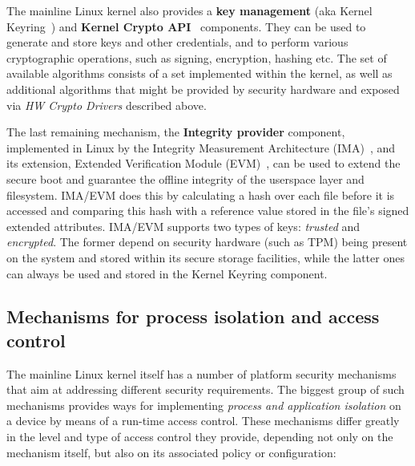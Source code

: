 The mainline Linux kernel also provides a \textbf{key management} (aka Kernel Keyring~\cite{keyrings}) and \textbf{Kernel Crypto API}~\cite{kernelcryptoapi} components. They can be used to generate and store keys and other credentials, and to perform various cryptographic operations, such as signing, encryption, hashing etc. The set of available algorithms consists of a set implemented within the kernel, as well as additional algorithms that might be provided by security hardware and exposed via \textit{HW Crypto Drivers} described above.

The last remaining mechanism, the \textbf{Integrity provider} component, implemented in Linux by the Integrity Measurement Architecture (IMA)~\cite{ima}, and its extension, Extended Verification Module (EVM)~\cite{ima}, can be used to extend the secure boot and guarantee the offline integrity of the userspace layer and filesystem. IMA/EVM does this by calculating a hash over each file before it is accessed and comparing this hash with a reference value stored in the file's signed extended attributes. IMA/EVM supports two types of keys: \textit{trusted} and \textit{encrypted}. The former depend on security hardware (such as TPM) being present on the system and stored within its secure storage facilities, while the latter ones can always be used and stored in the Kernel Keyring component. 

\subsection{Mechanisms for process isolation and access control}

The mainline Linux kernel itself has a number of platform security mechanisms that aim at addressing different security requirements. The biggest group of such mechanisms provides ways for implementing \textit{process and application isolation} on a device by means of a run-time access control. These mechanisms differ greatly in the level and type of access control they provide, depending not only on the mechanism itself, but also on its associated policy or configuration:

